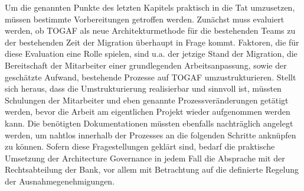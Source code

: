 Um die genannten Punkte des letzten Kapitels praktisch in die Tat umzusetzen, müssen bestimmte Vorbereitungen getroffen werden. Zunächst muss evaluiert werden, ob TOGAF als neue Architekturmethode für die bestehenden Teams zu der bestehenden Zeit der Migration überhaupt in Frage kommt. Faktoren, die für diese Evaluation eine Rolle spielen, sind u.a. der jetzige Stand der Migration, die Bereitschaft der Mitarbeiter einer grundlegenden Arbeitsanpassung, sowie der geschätzte Aufwand, bestehende Prozesse auf TOGAF umzustrukturieren. Stellt sich heraus, dass die Umstrukturierung realisierbar und sinnvoll ist, müssten Schulungen der Mitarbeiter und eben genannte Prozessveränderungen getätigt werden, bevor die Arbeit am eigentlichen Projekt wieder aufgenommen werden kann. Die benötigten Dokumentationen müssten ebenfalls nachträglich angelegt werden, um nahtlos innerhalb der Prozesses an die folgenden Schritte anknüpfen zu können. Sofern diese Fragestellungen geklärt sind, bedarf die praktische Umsetzung der Architecture Governance in jedem Fall die Absprache mit der Rechtsabteilung der Bank, vor allem mit Betrachtung auf die definierte Regelung der Ausnahmegenehmigungen. 